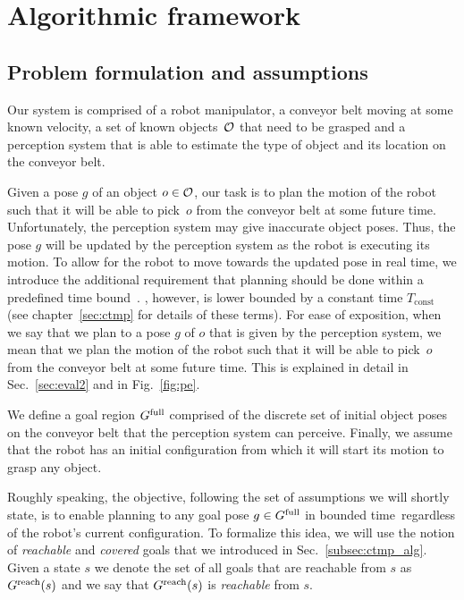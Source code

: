 \documentclass[a4paper]{report}
\begin{document}
\section{Algorithmic framework}
\subsection{Problem formulation and assumptions}
Our system is comprised of 
a robot manipulator,
a conveyor belt moving at some known velocity,
a set of known objects~$\mathcal{O}$ that need to be grasped and 
a perception system that is able to estimate the type of object and its location on the conveyor belt.

Given a pose $g$ of an object $o \in \mathcal{O}$, our task is to plan the motion of the robot such that it will be able to pick~$o$ from the conveyor belt at some future time.
%
Unfortunately, the perception system may give inaccurate object poses.
Thus, the pose $g$ will be updated by the perception system as the robot is executing its motion. 
To allow for the robot to move towards the updated pose in real time, we introduce the additional requirement that planning should be done within a predefined time bound~\Tbound. \Tbound, however, is lower bounded by a constant time $T_\textrm{const}$ (see chapter~\ref{sec:ctmp} for details of these terms).
%
For ease of exposition, when we say that we plan to a pose $g$ of $o$ that is given by the perception system, 
we mean that we plan the motion of the robot such that it will be able to pick~$o$ from the conveyor belt at some future time. 
This is explained in detail in Sec.~\ref{sec:eval2} and in Fig.~\ref{fig:pe}.

%
We define a goal region $G^{\textrm{full}}$ comprised of the discrete set of initial object poses on the conveyor belt that the perception system can perceive.
%
Finally, we assume that the robot has an initial configuration \Shome from which it will start its motion to grasp any object.


Roughly speaking, the objective, following the set of assumptions we will shortly state, is to enable planning to any goal pose $ g \in G^{\textrm{full}}$ in bounded time~\Tbound regardless of the robot's current configuration.
To formalize this idea, we will use the notion of \emph{reachable} and \emph{covered} goals that we introduced in Sec.~\ref{subsec:ctmp_alg}.
Given a state $s$ we denote the set of all goals that are reachable from $s$ as $G^{\rm reach}(s)$ and we say that $G^{\rm reach}(s)$ is \emph{reachable} from $s$.
\end{document}
